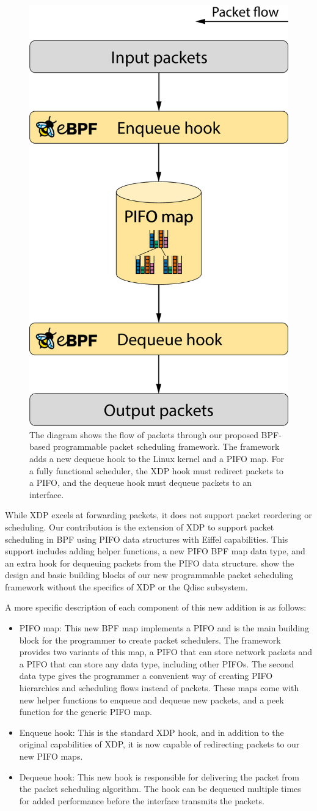 \documentclass[sigconf, nonacm]{acmart}
\begin{document}
\begin{figure}

  \includegraphics[width=0.4\linewidth]{bpf_pps_flow.pdf}

  \caption{The diagram shows the flow of packets through our proposed BPF-based programmable packet scheduling framework. The framework adds a new dequeue hook to the Linux kernel and a PIFO map. For a fully functional scheduler, the XDP hook must redirect packets to a PIFO, and the dequeue hook must dequeue packets to an interface.}
  \label{fig:bpf_pps_flow}
\end{figure}

While XDP excels at forwarding packets, it does not support packet reordering or scheduling. Our contribution is the extension of XDP to support packet scheduling in BPF using PIFO data structures with Eiffel capabilities. This support includes adding helper functions, a new PIFO BPF map data type, and an extra hook for dequeuing packets from the PIFO data structure.  show the design and basic building blocks of our new programmable packet scheduling framework without the specifics of XDP or the Qdisc subsystem.

A more specific description of each component of this new addition is as follows:

\begin{itemize}
        \item PIFO map: This new BPF map implements a PIFO and is the main building block for the programmer to create packet schedulers. The framework provides two variants of this map, a PIFO that can store network packets and a PIFO that can store any data type, including other PIFOs. The second data type gives the programmer a convenient way of creating PIFO hierarchies and scheduling flows instead of packets. These maps come with new helper functions to enqueue and dequeue new packets, and a peek function for the generic PIFO map.
        \item Enqueue hook: This is the standard XDP hook, and in addition to the original capabilities of XDP, it is now capable of redirecting packets to our new PIFO maps.
        \item Dequeue hook: This new hook is responsible for delivering the packet from the packet scheduling algorithm. The hook can be dequeued multiple times for added performance before the interface transmits the packets.
\end{itemize}
\end{document}
